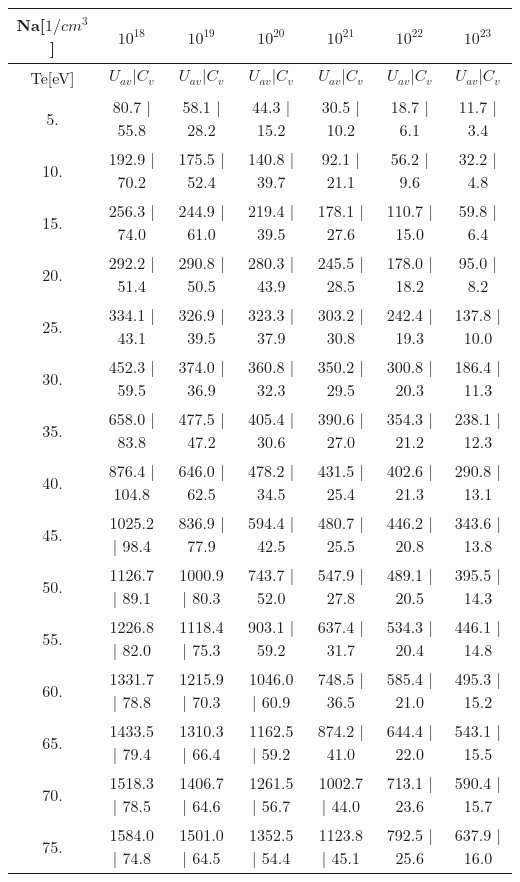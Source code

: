 \begin{tabular}{|c||c|c|c|c|c|c|}
\hline
Na[$1/cm^3$] & $10^{18}$ & $10^{19}$ & $10^{20}$ & $10^{21}$ & $10^{22}$ & $10^{23}$\tabularnewline
\hline
Te[eV] & $U_{av} | C_v$ & $U_{av} | C_v$ & $U_{av} | C_v$ & $U_{av} | C_v$ & $U_{av} | C_v$ & $U_{av} | C_v$\tabularnewline
\hline
\hline
   5. &     80.7 |    55.8 &     58.1 |    28.2 &     44.3 |    15.2 &     30.5 |    10.2 &     18.7 |     6.1 &     11.7 |     3.4\tabularnewline
\hline
  10. &    192.9 |    70.2 &    175.5 |    52.4 &    140.8 |    39.7 &     92.1 |    21.1 &     56.2 |     9.6 &     32.2 |     4.8\tabularnewline
\hline
  15. &    256.3 |    74.0 &    244.9 |    61.0 &    219.4 |    39.5 &    178.1 |    27.6 &    110.7 |    15.0 &     59.8 |     6.4\tabularnewline
\hline
  20. &    292.2 |    51.4 &    290.8 |    50.5 &    280.3 |    43.9 &    245.5 |    28.5 &    178.0 |    18.2 &     95.0 |     8.2\tabularnewline
\hline
  25. &    334.1 |    43.1 &    326.9 |    39.5 &    323.3 |    37.9 &    303.2 |    30.8 &    242.4 |    19.3 &    137.8 |    10.0\tabularnewline
\hline
  30. &    452.3 |    59.5 &    374.0 |    36.9 &    360.8 |    32.3 &    350.2 |    29.5 &    300.8 |    20.3 &    186.4 |    11.3\tabularnewline
\hline
  35. &    658.0 |    83.8 &    477.5 |    47.2 &    405.4 |    30.6 &    390.6 |    27.0 &    354.3 |    21.2 &    238.1 |    12.3\tabularnewline
\hline
  40. &    876.4 |   104.8 &    646.0 |    62.5 &    478.2 |    34.5 &    431.5 |    25.4 &    402.6 |    21.3 &    290.8 |    13.1\tabularnewline
\hline
  45. &   1025.2 |    98.4 &    836.9 |    77.9 &    594.4 |    42.5 &    480.7 |    25.5 &    446.2 |    20.8 &    343.6 |    13.8\tabularnewline
\hline
  50. &   1126.7 |    89.1 &   1000.9 |    80.3 &    743.7 |    52.0 &    547.9 |    27.8 &    489.1 |    20.5 &    395.5 |    14.3\tabularnewline
\hline
  55. &   1226.8 |    82.0 &   1118.4 |    75.3 &    903.1 |    59.2 &    637.4 |    31.7 &    534.3 |    20.4 &    446.1 |    14.8\tabularnewline
\hline
  60. &   1331.7 |    78.8 &   1215.9 |    70.3 &   1046.0 |    60.9 &    748.5 |    36.5 &    585.4 |    21.0 &    495.3 |    15.2\tabularnewline
\hline
  65. &   1433.5 |    79.4 &   1310.3 |    66.4 &   1162.5 |    59.2 &    874.2 |    41.0 &    644.4 |    22.0 &    543.1 |    15.5\tabularnewline
\hline
  70. &   1518.3 |    78.5 &   1406.7 |    64.6 &   1261.5 |    56.7 &   1002.7 |    44.0 &    713.1 |    23.6 &    590.4 |    15.7\tabularnewline
\hline
  75. &   1584.0 |    74.8 &   1501.0 |    64.5 &   1352.5 |    54.4 &   1123.8 |    45.1 &    792.5 |    25.6 &    637.9 |    16.0\tabularnewline

\end{tabular}

